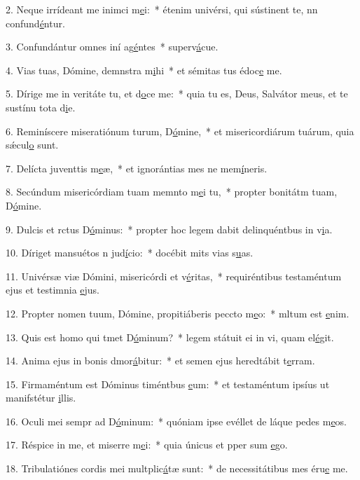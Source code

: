 2. Neque irrídeant me inimci m\uline{e}i:~* étenim univérsi, qui sústinent te, nn confund\uline{é}ntur.\par 
3. Confundántur omnes iní ag\uline{é}ntes~* superv\uline{á}cue.\par 
4. Vias tuas, Dómine, demnstra m\uline{i}hi~* et sémitas tus édoc\uline{e} me.\par 
5. Dírige me in veritáte tu, et d\uline{o}ce me:~* quia tu es, Deus, Salvátor meus, et te sustínu tota d\uline{i}e.\par 
6. Reminíscere miseratiónum turum, D\uline{ó}mine,~* et misericordiárum tuárum, quia  sǽcul\uline{o} sunt.\par 
7. Delícta juventtis m\uline{e}æ,~* et ignorántias mes ne mem\uline{í}neris.\par 
8. Secúndum misericórdiam tuam memnto m\uline{e}i tu,~* propter bonitátm tuam, D\uline{ó}mine.\par 
9. Dulcis et rctus D\uline{ó}minus:~* propter hoc legem dabit delinquéntbus in v\uline{i}a.\par 
10. Díriget mansuétos n jud\uline{í}cio:~* docébit mits vias s\uline{u}as.\par 
11. Univérsæ viæ Dómini, misericórdi et v\uline{é}ritas,~* requiréntibus testaméntum ejus et testimnia \uline{e}jus.\par 
12. Propter nomen tuum, Dómine, propitiáberis peccto m\uline{e}o:~* mltum est \uline{e}nim.\par 
13. Quis est homo qui tmet D\uline{ó}minum?~* legem státuit ei in vi, quam el\uline{é}git.\par 
14. Anima ejus in bonis dmor\uline{á}bitur:~* et semen ejus heredtábit t\uline{e}rram.\par 
15. Firmaméntum est Dóminus timéntbus \uline{e}um:~* et testaméntum ipsíus ut manifstétur \uline{i}llis.\par 
16. Oculi mei sempr ad D\uline{ó}minum:~* quóniam ipse evéllet de láque pedes m\uline{e}os.\par 
17. Réspice in me, et miserre m\uline{e}i:~* quia únicus et pper sum \uline{e}go.\par 
18. Tribulatiónes cordis mei multplic\uline{á}tæ sunt:~* de necessitátibus mes éru\uline{e} me.\par 
